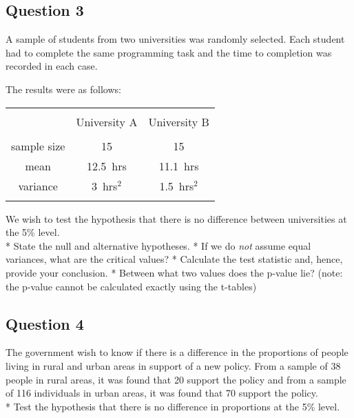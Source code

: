 


\subsection*{Question 3}
A sample of students from two universities was randomly selected. Each student had to complete the same programming task and the time to completion was recorded in each case. 

The results were as follows: \\

\begin{center}
\begin{tabular}{|c|c|c|}
\hline
&&\\[-0.4cm]
& University A & University B \\
\hline
&&\\[-0.4cm]
sample size & 15 & 15 \\
mean & 12.5\,\,\,hrs & 11.1\,\,\,hrs \\
variance & 3\,\,\,hrs$^2$ & 1.5\,\,\,hrs$^2$ \\
\hline
\multicolumn{3}{c}{}
\end{tabular}
\end{center}

We wish to test the hypothesis that there is no difference between universities at the 5\% level.\\[0.2cm]
* State the null and alternative hypotheses. 
 * If we do \emph{not} assume equal variances, what are the critical values? 
 * Calculate the test statistic and, hence, provide your conclusion. 
 * Between what two values does the p-value lie? (note: the p-value cannot be calculated exactly using the t-tables)



\subsection*{Question 4}
The government wish to know if there is a difference in the proportions of people living in rural and urban areas in support of a new policy. From a sample of 38 people in rural areas, it was found that 20 support the policy and from a sample of 116 individuals in urban areas, it was found that 70 support the policy. \\

* Test the hypothesis that there is no difference in proportions at the 5\% level.

